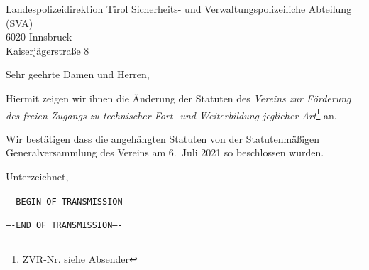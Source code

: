 \documentclass[a4paper,DIV=15,parskip=full,10pt]{scrartcl}
\begin{document}
\begin{letter}{Landespolizeidirektion Tirol Sicherheits- und Verwaltungspolizeiliche Abteilung (SVA)\\6020 Innsbruck\\Kaiserjägerstraße 8}
  \opening{Sehr geehrte Damen und Herren,}

  Hiermit zeigen wir ihnen die Änderung der Statuten des \textit{Vereins
    zur Förderung des freien Zugangs zu technischer Fort- und Weiterbildung
    jeglicher Art}\footnote{ZVR-Nr. siehe Absender} an.

  Wir bestätigen dass die angehängten Statuten von der Statutenmäßigen
  Generalversammlung des Vereins am 6.~Juli 2021 so beschlossen wurden.


\closing{Unterzeichnet,}

\afterpage{\null\thispagestyle{empty}\addtocounter{page}{-1}\newpage}

\setcounter{page}{0}
\newpage
\texttt{----BEGIN OF TRANSMISSION----}



\vspace{1em}
\texttt{----END OF TRANSMISSION----}

\end{letter}
\end{document}
